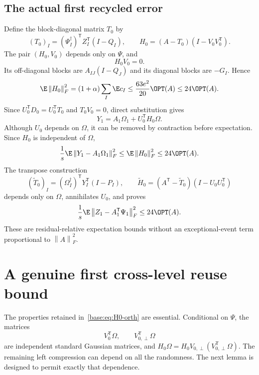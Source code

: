 \documentclass[11pt,oneside,openany,a4paper]{book}
\numberwithin{equation}{chapter}
\theoremstyle{definition}
\theoremstyle{remark}
\newcommand{\T}{\mathsf T}\newcommand{\Id}{I}
\newcommand{\F}[1]{\left\lVert#1\right\rVert_F}
\begin{document}
\subsection{The actual first recycled error}
Define the block-diagonal matrix $T_0$ by
\begin{equation}\label{base:eq:T0}
 (T_0)_I=(\Psi_I^\dagger)^{\T} Z_I^{\T}(I-Q_I),
 \qquad
 H_0=(A-T_0)(I-V_0V_0^{\T}).
\end{equation}
The pair $(H_0,V_0)$ depends only on $\Psi$, and
\begin{equation}\label{base:eq:H0-orth}
 H_0V_0=0.
\end{equation}
Its off-diagonal blocks are $A_{IJ}(I-Q_J)$ and its diagonal blocks are
$-G_I$. Hence
\begin{equation}\label{base:eq:H0-bound}
 \E\F{H_0}^2=(1+\alpha)\sum_I\E c_I
 \le\frac{63e^2}{20}\OPT(A)\le24\OPT(A).
\end{equation}
Since $U_0^{\T}D_0=U_0^{\T}T_0$ and $T_0V_0=0$, direct substitution gives
\begin{equation}\label{base:eq:first-noise-exact}
 Y_1=A_1\Omega_1+U_0^{\T}H_0\Omega.
\end{equation}
Although $U_0$ depends on $\Omega$, it can be removed by contraction before
expectation. Since $H_0$ is independent of $\Omega$,
\begin{equation}\label{base:eq:first-noise-bound}
 \frac1s\E\F{Y_1-A_1\Omega_1}^2
 \le\E\F{H_0}^2\le24\OPT(A).
\end{equation}
The transpose construction
\begin{equation}\label{base:eq:Ht0}
 (\widetilde T_0)_I=(\Omega_I^\dagger)^{\T}Y_I^{\T}(I-P_I),\qquad
 \widetilde H_0=(A^{\T}-\widetilde T_0)(I-U_0U_0^{\T})
\end{equation}
depends only on $\Omega$, annihilates $U_0$, and proves
\begin{equation}\label{base:eq:first-transpose-noise-bound}
 \frac1s\E\F{Z_1-A_1^{\T}\Psi_1}^2\le24\OPT(A).
\end{equation}
These are residual-relative expectation bounds without an exceptional-event
term proportional to $\F A^2$.

\section{A genuine first cross-level reuse bound}\label{base:sec:second}
The properties retained in~\eqref{base:eq:H0-orth} are essential. Conditional on
$\Psi$, the matrices
\begin{equation}\label{base:eq:retained-discarded-Gaussian}
 V_0^{\T}\Omega,\qquad V_{0,\perp}^{\T}\Omega
\end{equation}
are independent standard Gaussian matrices, and
$H_0\Omega=H_0V_{0,\perp}(V_{0,\perp}^{\T}\Omega)$.
The remaining left compression can depend on all the randomness. The next
lemma is designed to permit exactly that dependence.
\end{document}

